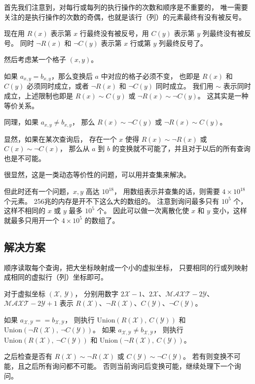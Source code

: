 \documentclass[withoutpreface,bwprint]{cumcmthesis}
\begin{document}
首先我们注意到，对每行或每列的执行操作的次数和顺序是不重要的，
唯一需要关注的是执行操作的次数的奇偶，也就是该行（列）的元素最终有没有被反号。

现在用 $R(x)$ 表示第 $x$ 行最终没有被反号，用 $C(y)$ 表示第 $y$ 列最终没有被反号。
同时 $\neg R(x)$ 和 $\neg C(y)$ 表示第 $x$ 行或第 $y$ 列最终反号了。

然后考虑某一个格子 $(x,y)$。

如果 $a_{x,y} = b_{x,y}$，那么变换后 $a$ 中对应的格子必须不变，
也即是 $R(x)$ 和 $C(y)$ 必须同时成立，或者 $\neg R(x)$ 和 $\neg C(y)$ 同时成立。
我们用 $\sim$ 表示同时成立，上述限制也即是 $R(x) \sim C(y)$ 或 $\neg{}R(x)\sim\neg{}C(y)$。
这其实是一种等价关系。

同理，如果 $a_{x,y} \ne b_{x,y}$，
那么 $R(x) \sim\neg C(y)$ 或 $\neg{}R(x)\sim{}C(y)$。

显然，如果在某次查询后，
存在一个 $x$ 使得 $R(x)\sim\neg{}R(x)$ 或 $C(x)\sim\neg{}C(x)$，
那么从 $a$ 到 $b$ 的变换就不可能了，并且对于以后的所有查询也是不可能。

很显然，这是一类动态等价性的问题，可以用并查集来解决。

但此时还有一个问题，$x,y$ 高达 $10^{18}$，
用数组表示并查集的话，则需要 $4\times{}10^{18}$ 个元素。
256兆的内存是开不下这么大的数组的。
注意到询问最多只有 $10^5$ 个，这样不相同的 $x$ 或 $y$ 最多 $10^5$ 个。
因此可以做一次离散化使 $x$ 和 $y$ 变小，这样就最多只用开一个 $4\times{}10^5$ 的数组了。

\subsection{解决方案}

顺序读取每个查询，把大坐标映射成一个小的虚拟坐标，
只要相同的行或列映射成相同的虚拟行（列）坐标即可。

\newcommand\mX{\mathscr{X}}
\newcommand\mY{\mathscr{Y}}
\newcommand\mU{\mathrm{Union}}
\newcommand\mF{\mathrm{Find}}

对于虚拟坐标 $(\mX,\:\mY)$，
分别用数字
$2\mX-1$、$2\mX$、$\mathcal{MAXT}-2\mY$、$\mathcal{MAXT}-2\mY+1$
表示
$R(\mX)$、$\neg{}R(\mX)$、$C(\mY)$、$\neg{}C(\mY)$。

如果 $a_{\mX,\mY} == b_{\mX,\mY}$，
则执行 $\mU(R(\mX),\:{}C(\mY))$ 和 $\mU(\neg{}R(\mX),\:\neg{}C(\mY))$。
如果 $a_{\mX,\mY} \ne b_{\mX,\mY}$，
则执行 $\mU(R(\mX),\:\neg{}C(\mY))$ 和 $\mU(\neg{}R(\mX),\:{}C(\mY))$。

之后检查是否有 $R(\mX)\sim\neg{}R(\mX)$ 或 $C(\mY)\sim\neg{}C(\mY)$。
若有则变换不可能，且之后所有询问都不可能。
否则当前询问后变换可能，继续处理下一个询问。
\end{document}
